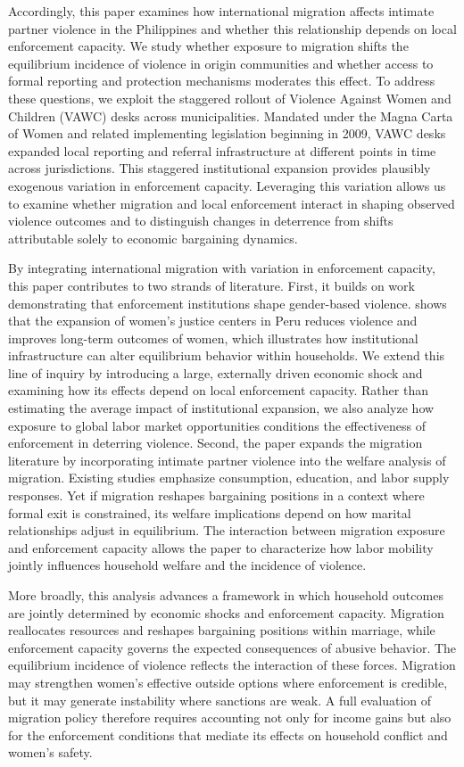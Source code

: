 \documentclass[12pt]{article}
\begin{document}
Accordingly, this paper examines how international migration affects intimate partner violence in the Philippines and whether this relationship depends on local enforcement capacity. We study whether exposure to migration shifts the equilibrium incidence of violence in origin communities and whether access to formal reporting and protection mechanisms moderates this effect. To address these questions, we exploit the staggered rollout of Violence Against Women and Children (VAWC) desks across municipalities. Mandated under the Magna Carta of Women and related implementing legislation beginning in 2009, VAWC desks expanded local reporting and referral infrastructure at different points in time across jurisdictions. This staggered institutional expansion provides plausibly exogenous variation in enforcement capacity. Leveraging this variation allows us to examine whether migration and local enforcement interact in shaping observed violence outcomes and to distinguish changes in deterrence from shifts attributable solely to economic bargaining dynamics.

By integrating international migration with variation in enforcement capacity, this paper contributes to two strands of literature. First, it builds on work demonstrating that enforcement institutions shape gender-based violence. \citet{sviatschi2024gender} shows that the expansion of women’s justice centers in Peru reduces violence and improves long-term outcomes of women, which illustrates how institutional infrastructure can alter equilibrium behavior within households. We extend this line of inquiry by introducing a large, externally driven economic shock and examining how its effects depend on local enforcement capacity. Rather than estimating the average impact of institutional expansion, we also analyze how exposure to global labor market opportunities conditions the effectiveness of enforcement in deterring violence. Second, the paper expands the migration literature by incorporating intimate partner violence into the welfare analysis of migration. Existing studies emphasize consumption, education, and labor supply responses. Yet if migration reshapes bargaining positions in a context where formal exit is constrained, its welfare implications depend on how marital relationships adjust in equilibrium. The interaction between migration exposure and enforcement capacity allows the paper to characterize how labor mobility jointly influences household welfare and the incidence of violence.

More broadly, this analysis advances a framework in which household outcomes are jointly determined by economic shocks and enforcement capacity. Migration reallocates resources and reshapes bargaining positions within marriage, while enforcement capacity governs the expected consequences of abusive behavior. The equilibrium incidence of violence reflects the interaction of these forces. Migration may strengthen women’s effective outside options where enforcement is credible, but it may generate instability where sanctions are weak. A full evaluation of migration policy therefore requires accounting not only for income gains but also for the enforcement conditions that mediate its effects on household conflict and women’s safety.
\end{document}
